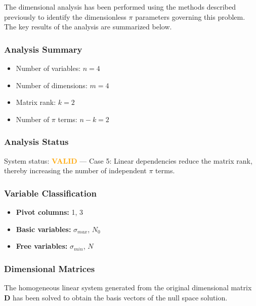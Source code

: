 The dimensional analysis has been performed using the methods described previously to identify the dimensionless $\pi$ parameters governing this problem. The key results of the analysis are summarized below.

\subsubsection*{Analysis Summary}
\begin{itemize}
    \item Number of variables: $n = 4$
    \item Number of dimensions: $m = 4$
    \item Matrix rank: $k = 2$
    \item Number of $\pi$ terms: $n-k = 2$
\end{itemize}

\subsubsection*{Analysis Status}
System status: \textcolor{orange}{\textbf{VALID}} --- Case 5: Linear dependencies reduce the matrix rank, thereby increasing the number of independent $\pi$ terms.

\subsubsection*{Variable Classification}
\begin{itemize}
    \item \textbf{Pivot columns:} 1, 3
    \item \textbf{Basic variables:} $\sigma_{max}$, $N_0$
    \item \textbf{Free variables:} $\sigma_{min}$, $N$
\end{itemize}

\subsubsection*{Dimensional Matrices}
The homogeneous linear system generated from the original dimensional matrix $\mathbf{D}$ has been solved to obtain the basis vectors of the null space solution.


